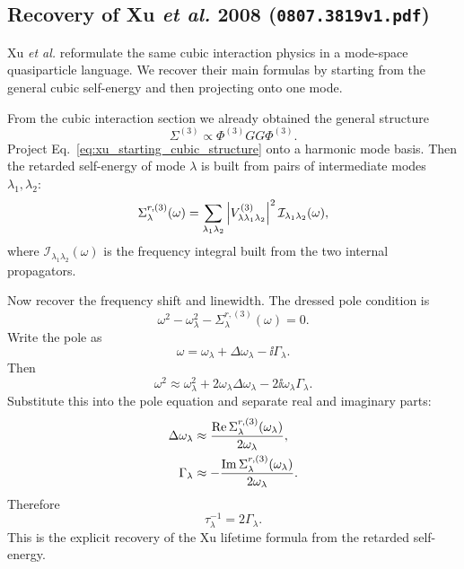 \subsection{Recovery of Xu \emph{et al.} 2008 (\texttt{0807.3819v1.pdf})}
Xu \emph{et al.} reformulate the same cubic interaction physics in a mode-space quasiparticle language. We recover their main formulas by starting from the general cubic self-energy and then projecting onto one mode.

From the cubic interaction section we already obtained the general structure
\begin{equation}
    \Sigma^{(3)} \propto \Phi^{(3)} G G \Phi^{(3)}.
    \label{eq:xu_starting_cubic_structure}
\end{equation}
Project Eq.~\eqref{eq:xu_starting_cubic_structure} onto a harmonic mode basis. Then the retarded self-energy of mode $\lambda$ is built from pairs of intermediate modes $\lambda_1,\lambda_2$:
\begin{equation}
    \Sigma_\lambda^{r,(3)}(\omega)
    =
    \sum_{\lambda_1\lambda_2}
    \left| V^{(3)}_{\lambda\lambda_1\lambda_2} \right|^2
    \mathcal I_{\lambda_1\lambda_2}(\omega),
    \label{eq:xu_mode_retarded_self_energy_recovered}
\end{equation}
where $\mathcal I_{\lambda_1\lambda_2}(\omega)$ is the frequency integral built from the two internal propagators.

Now recover the frequency shift and linewidth. The dressed pole condition is
\begin{equation}
    \omega^2 - \omega_\lambda^2 - \Sigma_\lambda^{r,(3)}(\omega) = 0.
\end{equation}
Write the pole as
\begin{equation}
    \omega = \omega_\lambda + \Delta\omega_\lambda - \ii\Gamma_\lambda.
\end{equation}
Then
\begin{equation}
    \omega^2 \approx \omega_\lambda^2 + 2\omega_\lambda\Delta\omega_\lambda - 2\ii\omega_\lambda\Gamma_\lambda.
\end{equation}
Substitute this into the pole equation and separate real and imaginary parts:
\begin{align}
    \Delta\omega_\lambda &\approx \frac{\operatorname{Re}\Sigma_\lambda^{r,(3)}(\omega_\lambda)}{2\omega_\lambda}, \\
    \Gamma_\lambda &\approx -\frac{\operatorname{Im}\Sigma_\lambda^{r,(3)}(\omega_\lambda)}{2\omega_\lambda}.
    \label{eq:xu_shift_linewidth_recovered}
\end{align}
Therefore
\begin{equation}
    \tau_\lambda^{-1} = 2\Gamma_\lambda.
    \label{eq:xu_lifetime_recovered}
\end{equation}
This is the explicit recovery of the Xu lifetime formula from the retarded self-energy.

